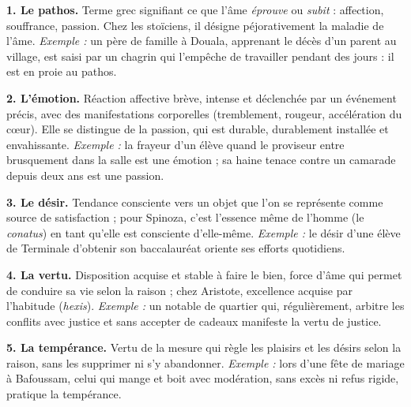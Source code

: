 \documentclass[11pt]{article}
\newcommand{\cle}[1]{{\popxbold\color{popdark}#1}}
\begin{document}
\begin{corrige}

\textbf{1. Le \cle{pathos}.} Terme grec signifiant ce que l'âme \emph{éprouve} ou \emph{subit} : affection, souffrance, passion. Chez les stoïciens, il désigne péjorativement la maladie de l'âme. \emph{Exemple :} un père de famille à Douala, apprenant le décès d'un parent au village, est saisi par un chagrin qui l'empêche de travailler pendant des jours : il est en proie au pathos.

\textbf{2. L'\cle{émotion}.} Réaction affective brève, intense et déclenchée par un événement précis, avec des manifestations corporelles (tremblement, rougeur, accélération du cœur). Elle se distingue de la passion, qui est durable, durablement installée et envahissante. \emph{Exemple :} la frayeur d'un élève quand le proviseur entre brusquement dans la salle est une émotion ; sa haine tenace contre un camarade depuis deux ans est une passion.

\textbf{3. Le \cle{désir}.} Tendance consciente vers un objet que l'on se représente comme source de satisfaction ; pour Spinoza, c'est l'essence même de l'homme (le \emph{conatus}) en tant qu'elle est consciente d'elle-même. \emph{Exemple :} le désir d'une élève de Terminale d'obtenir son baccalauréat oriente ses efforts quotidiens.

\textbf{4. La \cle{vertu}.} Disposition acquise et stable à faire le bien, force d'âme qui permet de conduire sa vie selon la raison ; chez Aristote, excellence acquise par l'habitude (\emph{hexis}). \emph{Exemple :} un notable de quartier qui, régulièrement, arbitre les conflits avec justice et sans accepter de cadeaux manifeste la vertu de justice.

\textbf{5. La \cle{tempérance}.} Vertu de la mesure qui règle les plaisirs et les désirs selon la raison, sans les supprimer ni s'y abandonner. \emph{Exemple :} lors d'une fête de mariage à Bafoussam, celui qui mange et boit avec modération, sans excès ni refus rigide, pratique la tempérance.

\end{corrige}
\end{document}
